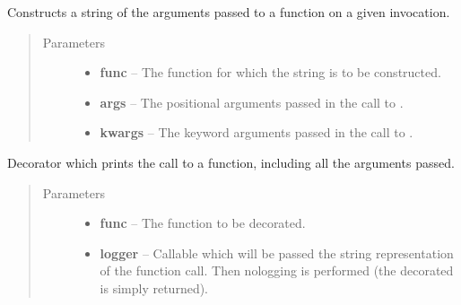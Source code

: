 \documentclass[letterpaper,10pt,english]{sphinxmanual}
\begin{document}

\begin{fulllineitems}
\label{docs/utilities:meta.create_arg_string}
Constructs a string of the arguments passed to a function on a given
invocation.
\begin{quote}\begin{description}
\item[{Parameters}] \leavevmode\begin{itemize}
\item {} 
\textbf{func} -- The function for which the string is to be constructed.

\item {} 
\textbf{args} -- The positional arguments passed in the call to .

\item {} 
\textbf{kwargs} -- The keyword arguments passed in the call to .

\end{itemize}

\end{description}\end{quote}

\end{fulllineitems}



\begin{fulllineitems}
\label{docs/utilities:meta.print_call}
Decorator which prints the call to a function, including all the arguments
passed.
\begin{quote}\begin{description}
\item[{Parameters}] \leavevmode\begin{itemize}
\item {} 
\textbf{func} -- The function to be decorated.

\item {} 
\textbf{logger} -- Callable which will be passed the string representation of
the function call. Then nologging is performed (the decorated is
simply returned).

\end{itemize}

\end{description}\end{quote}

\end{fulllineitems}
\end{document}
